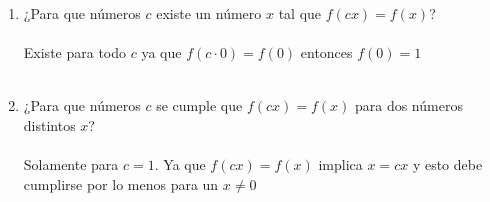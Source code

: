 \begin{ej}
\begin{enumerate}[\bfseries i)]
\item ¿Para que números $c$ existe un número $x$ tal que  $f(cx)=f(x)$?\\\\
Existe para todo $c$ ya que $f(c \cdot 0) = f(0)$ entonces $f(0)=1$\\\\

\item ¿Para que números $c$ se cumple que $f(cx)=f(x)$ para dos números distintos $x$?\\\\
Solamente para $c=1.$ Ya que $f(cx)=f(x)$ implica $x=cx$ y esto debe cumplirse por lo menos para un $x\neq 0$\\\\ 
\end{enumerate}
\end{ej}

